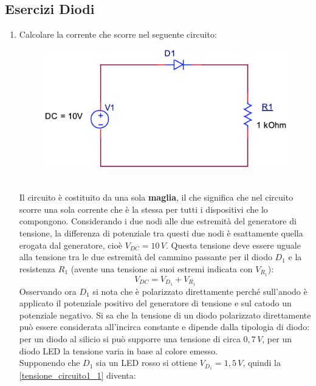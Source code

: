 \documentclass[12pt, a4paper]{report}
\begin{document}
\begin{appendices}

\chapter{Esercizi Diodi}
\begin{enumerate}
    \item Calcolare la corrente che scorre nel seguente circuito:
    \begin{figure}[h]
        \centering
        \includegraphics[scale=0.3,angle=0]{diodi_es1.png}
    \end{figure}
    \\Il circuito è costituito da una sola \textbf{maglia}, il che significa che nel circuito scorre una sola corrente che è la stessa per tutti i dispositivi che lo compongono. Considerando i due nodi alle due estremità del generatore di tensione, la differenza di potenziale tra questi due nodi è esattamente quella erogata dal generatore, cioè $V_{DC} = 10\,V$. Questa tensione deve essere uguale alla tensione tra le due estremità del cammino passante per il diodo $D_1$ e la resistenza $R_1$ (avente una tensione ai suoi estremi indicata con $V_{R_1}$):
    \begin{equation}
        V_{DC} = V_{D_1} + V_{R_1}
        \label{tensione_circuito1_1}
    \end{equation}
    Osservando ora $D_1$ si nota che è polarizzato direttamente perché sull'anodo è applicato il potenziale positivo del generatore di tensione e sul catodo un potenziale negativo. Si sa che la tensione di un diodo polarizzato direttamente può essere considerata all'incirca constante e dipende dalla tipologia di diodo: per un diodo al silicio si può supporre una tensione di circa $0,7\,V$, per un diodo LED la tensione varia in base al colore emesso.\\Supponendo che $D_1$ sia un LED rosso si ottiene $V_{D_1} = 1,5\,V$, quindi la \eqref{tensione_circuito1_1} diventa:

\end{enumerate}
\end{appendices}
\end{document}
